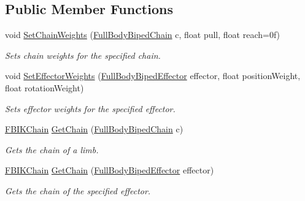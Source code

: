 \subsection*{Public Member Functions}
\begin{DoxyCompactItemize}
\item 
void \mbox{\hyperlink{class_root_motion_1_1_final_i_k_1_1_i_k_solver_full_body_biped_a957b832f70b2e5b9b203797a0aa21c7b}{Set\+Chain\+Weights}} (\mbox{\hyperlink{namespace_root_motion_1_1_final_i_k_ae8848c0353270a08dcfe8b85a5c9b761}{Full\+Body\+Biped\+Chain}} c, float pull, float reach=0f)
\begin{DoxyCompactList}\small\item\em Sets chain weights for the specified chain. \end{DoxyCompactList}\item 
void \mbox{\hyperlink{class_root_motion_1_1_final_i_k_1_1_i_k_solver_full_body_biped_a0f70c62cab21131a696082750670a36c}{Set\+Effector\+Weights}} (\mbox{\hyperlink{namespace_root_motion_1_1_final_i_k_ae0dd2058c7667b6f132c11a6b860c14a}{Full\+Body\+Biped\+Effector}} effector, float position\+Weight, float rotation\+Weight)
\begin{DoxyCompactList}\small\item\em Sets effector weights for the specified effector. \end{DoxyCompactList}\item 
\mbox{\hyperlink{class_root_motion_1_1_final_i_k_1_1_f_b_i_k_chain}{F\+B\+I\+K\+Chain}} \mbox{\hyperlink{class_root_motion_1_1_final_i_k_1_1_i_k_solver_full_body_biped_a8b377dae8738c5a77ff88bf4bb5c8087}{Get\+Chain}} (\mbox{\hyperlink{namespace_root_motion_1_1_final_i_k_ae8848c0353270a08dcfe8b85a5c9b761}{Full\+Body\+Biped\+Chain}} c)
\begin{DoxyCompactList}\small\item\em Gets the chain of a limb. \end{DoxyCompactList}\item 
\mbox{\hyperlink{class_root_motion_1_1_final_i_k_1_1_f_b_i_k_chain}{F\+B\+I\+K\+Chain}} \mbox{\hyperlink{class_root_motion_1_1_final_i_k_1_1_i_k_solver_full_body_biped_a8ffb80b6fed2ba10516c47d1266a136a}{Get\+Chain}} (\mbox{\hyperlink{namespace_root_motion_1_1_final_i_k_ae0dd2058c7667b6f132c11a6b860c14a}{Full\+Body\+Biped\+Effector}} effector)
\begin{DoxyCompactList}\small\item\em Gets the chain of the specified effector. \end{DoxyCompactList}\item 

\end{DoxyCompactItemize}
